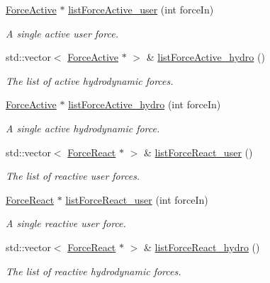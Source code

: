 \begin{DoxyCompactItemize}
\hyperlink{classosea_1_1ofreq_1_1_force_active}{Force\-Active} $\ast$ \hyperlink{classosea_1_1ofreq_1_1_body_ad55994a87e95520959a2d236e02168ea}{list\-Force\-Active\-\_\-user} (int force\-In)
\begin{DoxyCompactList}\small\item\em A single active user force. \end{DoxyCompactList}\item 
std\-::vector$<$ \hyperlink{classosea_1_1ofreq_1_1_force_active}{Force\-Active} $\ast$ $>$ \& \hyperlink{classosea_1_1ofreq_1_1_body_a2169495533eebe0f4f05d9e2cb71f42b}{list\-Force\-Active\-\_\-hydro} ()
\begin{DoxyCompactList}\small\item\em The list of active hydrodynamic forces. \end{DoxyCompactList}\item 
\hyperlink{classosea_1_1ofreq_1_1_force_active}{Force\-Active} $\ast$ \hyperlink{classosea_1_1ofreq_1_1_body_aa83129940f0eb3a27686b35292bf3339}{list\-Force\-Active\-\_\-hydro} (int force\-In)
\begin{DoxyCompactList}\small\item\em A single active hydrodynamic force. \end{DoxyCompactList}\item 
std\-::vector$<$ \hyperlink{classosea_1_1ofreq_1_1_force_react}{Force\-React} $\ast$ $>$ \& \hyperlink{classosea_1_1ofreq_1_1_body_afc1e6e0018dd26cc3702b74aea12ed9b}{list\-Force\-React\-\_\-user} ()
\begin{DoxyCompactList}\small\item\em The list of reactive user forces. \end{DoxyCompactList}\item 
\hyperlink{classosea_1_1ofreq_1_1_force_react}{Force\-React} $\ast$ \hyperlink{classosea_1_1ofreq_1_1_body_a8afe32e16a7869395083de6cb0aca63e}{list\-Force\-React\-\_\-user} (int force\-In)
\begin{DoxyCompactList}\small\item\em A single reactive user force. \end{DoxyCompactList}\item 
std\-::vector$<$ \hyperlink{classosea_1_1ofreq_1_1_force_react}{Force\-React} $\ast$ $>$ \& \hyperlink{classosea_1_1ofreq_1_1_body_ad68893d21ecf337242d68936132ad25a}{list\-Force\-React\-\_\-hydro} ()
\begin{DoxyCompactList}\small\item\em The list of reactive hydrodynamic forces. \end{DoxyCompactList}\item 

\end{DoxyCompactItemize}
